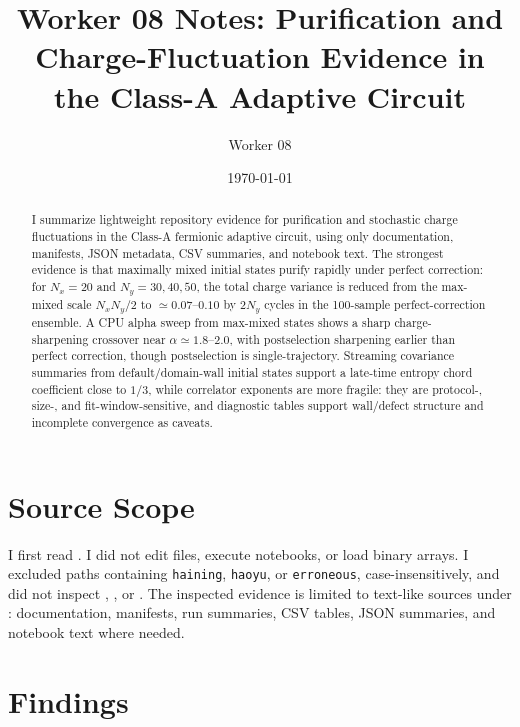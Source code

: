 \documentclass[aps,prb,onecolumn,nofootinbib,superscriptaddress]{revtex4-2}
\begin{document}
\title{Worker 08 Notes: Purification and Charge-Fluctuation Evidence in the Class-A Adaptive Circuit}

\author{Worker 08}
\date{\today}

\begin{abstract}
I summarize lightweight repository evidence for purification and stochastic charge fluctuations in the Class-A fermionic adaptive circuit, using only documentation, manifests, JSON metadata, CSV summaries, and notebook text.  The strongest evidence is that maximally mixed initial states purify rapidly under perfect correction: for $N_x=20$ and $N_y=30,40,50$, the total charge variance is reduced from the max-mixed scale $N_xN_y/2$ to $\simeq 0.07$--$0.10$ by $2N_y$ cycles in the 100-sample perfect-correction ensemble.  A CPU alpha sweep from max-mixed states shows a sharp charge-sharpening crossover near $\alpha\simeq1.8$--$2.0$, with postselection sharpening earlier than perfect correction, though postselection is single-trajectory.  Streaming covariance summaries from default/domain-wall initial states support a late-time entropy chord coefficient close to $1/3$, while correlator exponents are more fragile: they are protocol-, size-, and fit-window-sensitive, and diagnostic tables support wall/defect structure and incomplete convergence as caveats.
\end{abstract}

\maketitle
\tableofcontents

\section{Source Scope}

I first read .  I did not edit files, execute notebooks, or load binary arrays.  I excluded paths containing \texttt{haining}, \texttt{haoyu}, or \texttt{erroneous}, case-insensitively, and did not inspect , , or .  The inspected evidence is limited to text-like sources under : documentation, manifests, run summaries, CSV tables, JSON summaries, and notebook text where needed.

\section{Findings}
\end{document}
